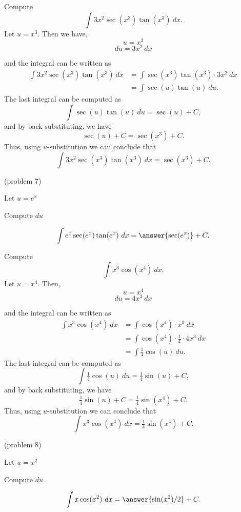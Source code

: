 \documentclass[handout]{ximera}
\begin{document}
\begin{example}[example 7] Compute 
\[\int 3x^2\sec(x^3)\tan(x^3) \ dx.\]
Let $u = x^3$.  Then we have,
\[u = x^3\]
\[du = 3x^2 \ dx\]

and the integral can be written as 
\begin{align*}
\int 3x^2\sec(x^3)\tan(x^3) \ dx &= \int \sec(x^3)\tan(x^3) \cdot 3x^2 \ dx\\
&= \int \sec(u)\tan(u) \ du.
\end{align*}
The last integral can be computed as 
\[\int \sec(u)\tan(u) \ du = \sec(u) + C,\]
and by back substituting, we have 
\[\sec(u) + C = \sec(x^3) + C.\]
Thus, using $u$-substitution we can conclude that
\[\int 3x^2\sec(x^3)\tan(x^3) \ dx =  \sec(x^3) + C.\]
\end{example}

\begin{problem}(problem 7)
\begin{hint}
Let $u = e^x$
\end{hint}
\begin{hint}
Compute $du$
\end{hint}
\[\int e^x\sec(e^x)\tan(e^x) \ dx = \answer{\sec(e^x)} +C.\]
\end{problem}


\begin{example}[example 8] Compute 
\[\int x^3\cos(x^4) \ dx.\]
Let $u = x^4$.  Then,
\[u = x^4\]
\[du = 4x^3 \ dx\]

and the integral can be written as 
\begin{align*}
\int x^3\cos(x^4) \ dx &= \int \cos(x^4) \cdot x^3\  dx \\
&=  \int \cos(x^4)\cdot \tfrac14 \cdot 4x^3\  dx\\
&=  \int \tfrac14\cos(u) \ du.
\end{align*}
The last integral can be computed as 
\[\int \tfrac14 \cos(u) \ du = \tfrac14 \sin(u) + C,\]
and by back substituting, we have 
\[\tfrac14 \sin(u) + C = \tfrac14 \sin(x^4) + C.\]
Thus, using $u$-substitution we can conclude that
\[\int x^3\cos(x^4) \ dx =  \tfrac14 \sin(x^4) + C.\]
\end{example}

\begin{problem}(problem 8)
\begin{hint}
Let $u = x^2$
\end{hint}
\begin{hint}
Compute $du$
\end{hint}
\[\int x\cos(x^2) \ dx = \answer{\sin(x^2)/2} +C.\]
\end{problem}
\end{document}
